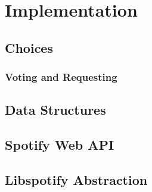 \chapter{Implementation}

\section{Choices}



\subsection{Voting and Requesting}


\section{Data Structures}




\section{Spotify Web API}


\section{Libspotify Abstraction}

